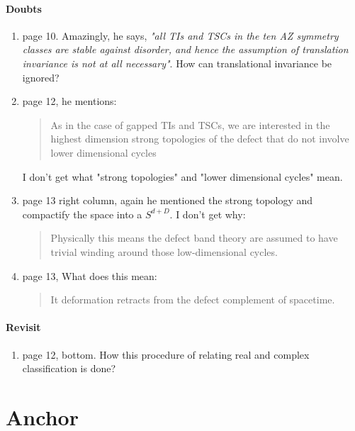 \documentclass{article}
\begin{document}
\paragraph{Doubts}
\begin{enumerate}
    \item page 10. Amazingly, he says, \textit{"all TIs and TSCs in
        the ten AZ symmetry classes are stable against disorder, and
        hence the assumption of translation invariance is not at all
        necessary"}.  How can translational invariance be ignored?
    \item page 12, he mentions:
        \begin{quote}
            As in the case of gapped TIs and TSCs, we are interested
            in the highest dimension strong topologies of the defect
            that do not involve lower dimensional cycles
        \end{quote}
        I don't get what "strong topologies" and "lower dimensional
        cycles" mean.
    \item page 13 right column, again he mentioned the strong topology
        and compactify the space into a $S^{d+D}$. I don't get why:
        \begin{quote}
            Physically this means the defect band theory are assumed
            to have trivial winding around those low-dimensional
            cycles.
        \end{quote}
        
    \item page 13, What does this mean:
        \begin{quote}
            It deformation retracts from the defect complement of
            spacetime.
        \end{quote}
        
\end{enumerate}

\paragraph{Revisit}
\begin{enumerate}
    \item page 12, bottom. How this procedure of relating real and
        complex classification is done?
\end{enumerate}
\section{Anchor}
\label{sec:Anchor}
\end{document}
